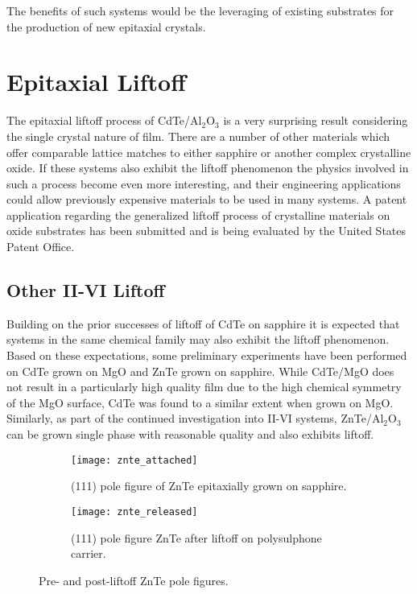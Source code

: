 The benefits of such systems would be the leveraging of existing substrates for the production of new epitaxial crystals.

\section{Epitaxial Liftoff}
The epitaxial liftoff process of CdTe/Al\(_2\)O\(_3\) is a very surprising result considering the single crystal nature of film.
There are a number of other materials which offer comparable lattice matches to either sapphire or another complex crystalline oxide.
If these systems also exhibit the liftoff phenomenon the physics involved in such a process become even more interesting, and their engineering applications could allow previously expensive materials to be used in many systems.
A patent application regarding the generalized liftoff process of crystalline materials on oxide substrates has been submitted and is being evaluated by the United States Patent Office.

\subsection{Other II-VI Liftoff} Building on the prior successes of liftoff of CdTe on sapphire it is expected that systems in the same chemical family may also exhibit the liftoff phenomenon.
Based on these expectations, some preliminary experiments have been performed on CdTe grown on MgO and ZnTe grown on sapphire.
While CdTe/MgO does not result in a particularly high quality film due to the high chemical symmetry of the MgO surface, CdTe was found to a similar extent when grown on MgO\@. Similarly, as part of the continued investigation into II-VI systems, ZnTe/Al\(_2\)O\(_3\) can be grown single phase with reasonable quality and also exhibits liftoff.
\begin{figure}
 \centering
 \begin{subfigure}[t]{0.47\textwidth}
  \centering \texttt{[image: znte\_attached]}
  \caption{\label{fig:znte_attached}(111) pole figure of ZnTe epitaxially grown on sapphire.}
 \end{subfigure}\quad%
 \begin{subfigure}[t]{0.47\textwidth}
  \centering \texttt{[image: znte\_released]}
  \caption{\label{fig:znte_released}(111) pole figure ZnTe after liftoff on polysulphone carrier.}
 \end{subfigure}
 \caption{\label{fig:znte_liftoff}Pre- and post-liftoff ZnTe pole figures.}
\end{figure}

